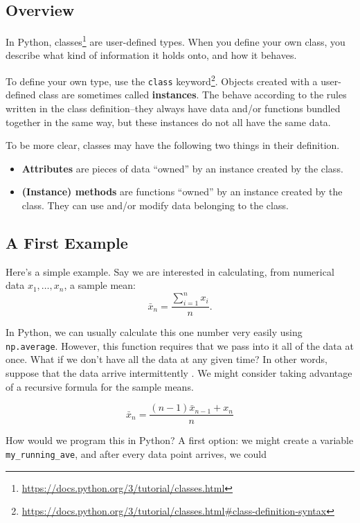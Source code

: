 \documentclass[
  12pt,
  krantz2]{krantz}
\renewcommand{\href}[2]{#2\footnote{\url{#1}}}
\begin{document}
\hypertarget{overview}{%
\subsection{Overview}\label{overview}}

In Python, \href{https://docs.python.org/3/tutorial/classes.html}{classes} are user-defined types. When you define your own class, you describe what kind of information it holds onto, and how it behaves.

To define your own type, use the \href{https://docs.python.org/3/tutorial/classes.html\#class-definition-syntax}{\texttt{class} keyword}. Objects created with a user-defined class are sometimes called \textbf{instances}. The behave according to the rules written in the class definition--they always have data and/or functions bundled together in the same way, but these instances do not all have the same data.

To be more clear, classes may have the following two things in their definition.

\begin{itemize}
\item
  \textbf{Attributes} are pieces of data ``owned'' by an instance created by the class.
\item
  \textbf{(Instance) methods} are functions ``owned'' by an instance created by the class. They can use and/or modify data belonging to the class.
\end{itemize}

\hypertarget{a-first-example}{%
\subsection{A First Example}\label{a-first-example}}

Here's a simple example. Say we are interested in calculating, from numerical data \(x_1, \ldots, x_n\), a sample mean:
\[
\bar{x}_n = \frac{\sum_{i=1}^n x_i}{n}.
\]

In Python, we can usually calculate this one number very easily using \texttt{np.average}. However, this function requires that we pass into it all of the data at once. What if we don't have all the data at any given time? In other words, suppose that the data arrive intermittently
.
We might consider taking advantage of a recursive formula for the sample means.

\[
\bar{x}_n =  \frac{(n-1) \bar{x}_{n-1} + x_n}{n}
\]

How would we program this in Python? A first option: we might create a variable \texttt{my\_running\_ave}, and after every data point arrives, we could
\end{document}
